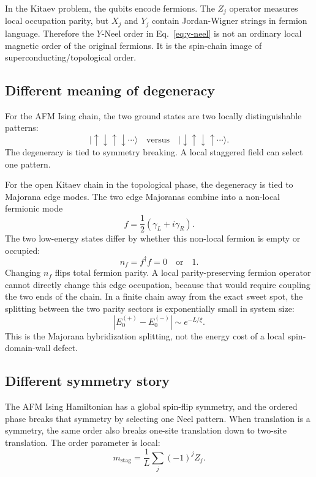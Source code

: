 \documentclass[11pt]{article}
\newcommand{\ket}[1]{|#1\rangle}
\newcommand{\up}{\uparrow}
\newcommand{\down}{\downarrow}
\begin{document}
In the Kitaev problem, the qubits encode fermions. The $Z_j$ operator measures
local occupation parity, but $X_j$ and $Y_j$ contain Jordan-Wigner strings in
fermion language. Therefore the $Y$-Neel order in Eq.~\eqref{eq:y-neel} is not
an ordinary local magnetic order of the original fermions. It is the spin-chain
image of superconducting/topological order.

\subsection{Different meaning of degeneracy}

For the AFM Ising chain, the two ground states are two locally distinguishable
patterns:
\begin{equation}
  \ket{\up\down\up\down\cdots}
  \quad \text{versus} \quad
  \ket{\down\up\down\up\cdots}.
\end{equation}
The degeneracy is tied to symmetry breaking. A local staggered field can select
one pattern.

For the open Kitaev chain in the topological phase, the degeneracy is tied to
Majorana edge modes. The two edge Majoranas combine into a non-local fermionic
mode
\begin{equation}
  f=\frac{1}{2}(\gamma_L+i\gamma_R).
\end{equation}
The two low-energy states differ by whether this non-local fermion is empty or
occupied:
\begin{equation}
  n_f=f^\dagger f=0 \quad \text{or} \quad 1.
\end{equation}
Changing $n_f$ flips total fermion parity. A local parity-preserving fermion
operator cannot directly change this edge occupation, because that would require
coupling the two ends of the chain. In a finite chain away from the exact sweet
spot, the splitting between the two parity sectors is exponentially small in
system size:
\begin{equation}
  |E_0^{(+)}-E_0^{(-)}|\sim e^{-L/\xi}.
\end{equation}
This is the Majorana hybridization splitting, not the energy cost of a local
spin-domain-wall defect.

\subsection{Different symmetry story}

The AFM Ising Hamiltonian has a global spin-flip symmetry, and the ordered
phase breaks that symmetry by selecting one Neel pattern. When translation is a
symmetry, the same order also breaks one-site translation down to two-site
translation. The order parameter is local:
\begin{equation}
  m_{\mathrm{stag}}=\frac{1}{L}\sum_j(-1)^jZ_j.
\end{equation}
\end{document}
